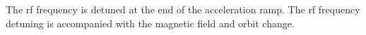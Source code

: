 %
%
%
%

The rf frequency is detuned at the end of the acceleration ramp. The rf frequency detuning is accompanied with the magnetic field and orbit change.

